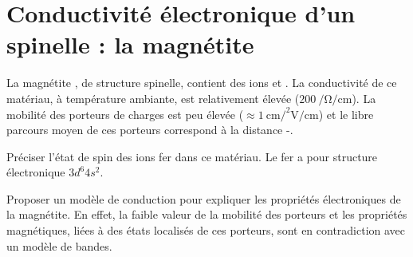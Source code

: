 \section{Conductivité électronique d’un spinelle : la magnétite }

\setcounter{equation}{0}
\setcounter{Q}{0}

La magnétite , de structure spinelle, contient des ions  et . La conductivité de ce matériau, à température ambiante, est relativement élevée ($200 ~ \si{\per\ohm\per\centi\meter}$). La mobilité des porteurs de charges est peu élevée ($\approx 1 ~ \si{\centi\meter\square\per\volt\per\centi\meter}$) et le libre parcours moyen de ces porteurs correspond à la distance -.

\Q Préciser l’état de spin des ions fer dans ce matériau. Le fer a pour structure électronique $3d^6 4s^2$.

\Q Proposer un modèle de conduction pour expliquer les propriétés électroniques de la magnétite. En effet, la faible valeur de la mobilité des porteurs et les propriétés magnétiques, liées à des états localisés de ces porteurs, sont en contradiction avec un modèle de bandes.
